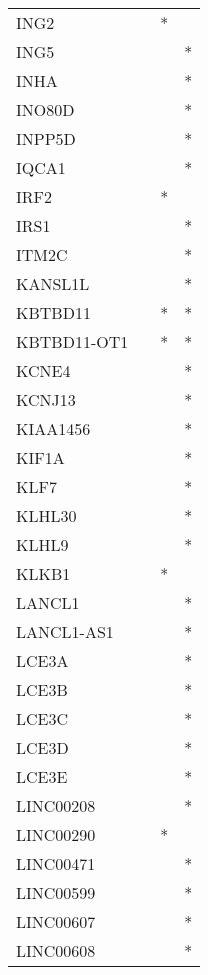 \begin{longtable}{lccc}
ING2           &       &  * &         \\
ING5           &       &    &       * \\
INHA           &       &    &       * \\
INO80D         &       &    &       * \\
INPP5D         &       &    &       * \\
IQCA1          &       &    &       * \\
IRF2           &       &  * &         \\
IRS1           &       &    &       * \\
ITM2C          &       &    &       * \\
KANSL1L        &       &    &       * \\
KBTBD11        &       &  * &       * \\
KBTBD11-OT1    &       &  * &       * \\
KCNE4          &       &    &       * \\
KCNJ13         &       &    &       * \\
KIAA1456       &       &    &       * \\
KIF1A          &       &    &       * \\
KLF7           &       &    &       * \\
KLHL30         &       &    &       * \\
KLHL9          &       &    &       * \\
KLKB1          &       &  * &         \\
LANCL1         &       &    &       * \\
LANCL1-AS1     &       &    &       * \\
LCE3A          &       &    &       * \\
LCE3B          &       &    &       * \\
LCE3C          &       &    &       * \\
LCE3D          &       &    &       * \\
LCE3E          &       &    &       * \\
LINC00208      &       &    &       * \\
LINC00290      &       &  * &         \\
LINC00471      &       &    &       * \\
LINC00599      &       &    &       * \\
LINC00607      &       &    &       * \\
LINC00608      &       &    &       * \\

\end{longtable}
